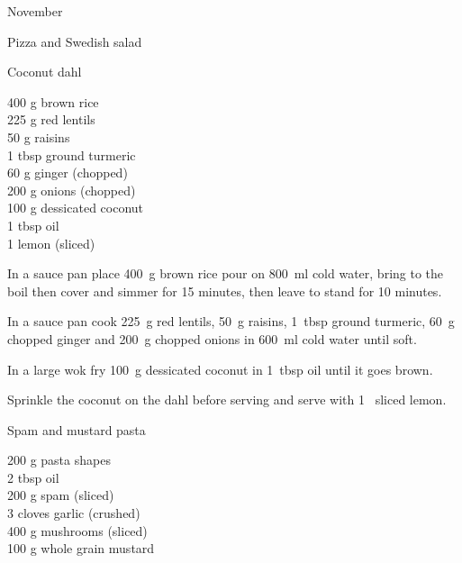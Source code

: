 \begin{menu}{November}
\begin{recipe}{1}{Pizza and Swedish salad}
\begin{instructions}
    \end{instructions}
    \end{recipe}%
  
    \begin{recipe}{2}{Coconut dahl}%
		\begin{ingredients}
		400 g brown rice  \\
	225 g red lentils  \\
	50 g raisins  \\
	1 tbsp ground turmeric  \\
	60 g ginger (chopped) \\
	200 g onions (chopped) \\
	100 g dessicated coconut  \\
	1 tbsp oil  \\
	1  lemon (sliced) \\
	
		\end{ingredients}
	
    \begin{instructions}
    \item 
      In a
      sauce pan
      place
      400~g  brown rice
      pour on
      800~ml  cold water,
      bring to the boil then cover and simmer for 15 minutes,
      then leave to stand for 10 minutes.
    \item 
        In a sauce pan cook
        225~g  red lentils,
        50~g  raisins,
        1~tbsp  ground turmeric,
        60~g chopped ginger
        and
        200~g chopped onions
        in
        600~ml  cold water
        until soft.
      \item 
        In a large wok fry
        100~g  dessicated coconut
        in
        1~tbsp  oil
        until it goes brown.
      \item 
        Sprinkle the coconut on the dahl
        before serving
        and
        serve with
        1~ sliced lemon.
      
    \end{instructions}
    \end{recipe}%
  
    \begin{recipe}{1}{Spam and mustard pasta}%
		\begin{ingredients}
		200 g pasta shapes  \\
	2 tbsp oil  \\
	200 g spam (sliced) \\
	3 cloves garlic (crushed) \\
	400 g mushrooms (sliced) \\
	100 g whole grain mustard  \\
	

\end{ingredients}
\end{recipe}
\end{menu}

